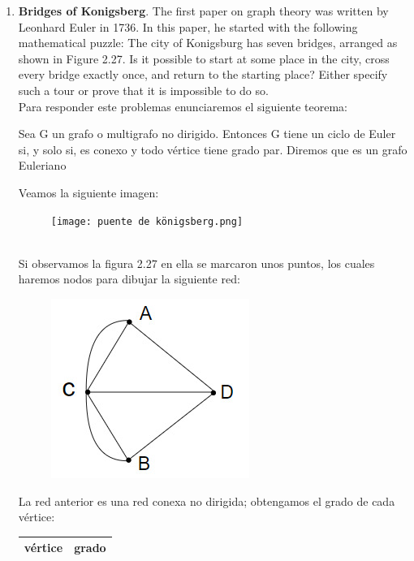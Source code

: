 \documentclass{report}
\begin{document}
\begin{enumerate}[2.1]
\begin{enumerate}[(a)]
\begin{figure}[h!t]
        \end{figure}
    \end{enumerate} %
    \newpage
    \item {\bfseries Bridges of Konigsberg}. The first paper on graph theory was written by Leonhard Euler
    in 1736. In this paper, he started with the following mathematical puzzle: The city of
    Konigsburg has seven bridges, arranged as shown in Figure 2.27. Is it possible to start
    at some place in the city, cross every bridge exactly once, and return to the starting
    place? Either specify such a tour or prove that it is impossible to do so.
    \\ Para responder este problemas enunciaremos el siguiente teorema:
    \begin{theo}{}{}
        Sea G un grafo o multigrafo no dirigido. Entonces G tiene un ciclo de Euler si, y solo si, es conexo y todo vértice tiene grado par. Diremos que es un grafo Euleriano
    \end{theo}
    Veamos la siguiente imagen:
    \begin{figure}[ht]
        \centering
        \texttt{[image: puente de königsberg.png]}
        \label{puente}
    \end{figure}
    \\ Si observamos la figura 2.27 en ella se marcaron unos puntos, los cuales haremos nodos para dibujar la siguiente red:
    \begin{figure}[ht]
        \centering
        \includegraphics[scale = 0.5]{diagrama puente.jpeg}
    \end{figure}
    \newpage La red anterior es una red conexa no dirigida; obtengamos el grado de cada vértice:
    \begin{table}[ht]
        \centering
        \begin{tabular}{|c|c|}
        \hline
        \textbf{vértice} & \textbf{grado} \\ \hline

\end{tabular}
\end{table}
\end{enumerate}
\end{document}
